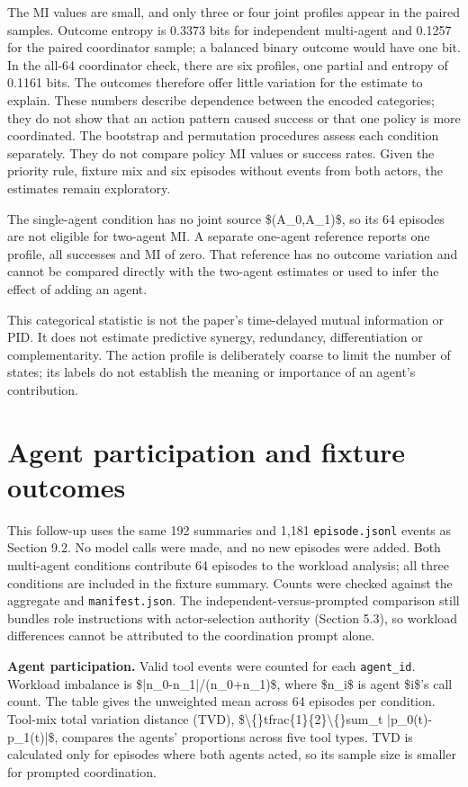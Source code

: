 \documentclass[12pt,a4paper,oneside]{report}
\begin{document}
The MI values are small, and only three or four joint profiles appear in the paired samples. Outcome entropy is 0.3373 bits for independent multi-agent and 0.1257 for the paired coordinator sample; a balanced binary outcome would have one bit. In the all-64 coordinator check, there are six profiles, one partial and entropy of 0.1161 bits. The outcomes therefore offer little variation for the estimate to explain. These numbers describe dependence between the encoded categories; they do not show that an action pattern caused success or that one policy is more coordinated. The bootstrap and permutation procedures assess each condition separately. They do not compare policy MI values or success rates. Given the priority rule, fixture mix and six episodes without events from both actors, the estimates remain exploratory.

The single-agent condition has no joint source \$(A\allowbreak\_0,A\allowbreak\_1)\$, so its 64 episodes are not eligible for two-agent MI. A separate one-agent reference reports one profile, all successes and MI of zero. That reference has no outcome variation and cannot be compared directly with the two-agent estimates or used to infer the effect of adding an agent.

This categorical statistic is not the paper’s time-delayed mutual information or PID. It does not estimate predictive synergy, redundancy, differentiation or complementarity. The action profile is deliberately coarse to limit the number of states; its labels do not establish the meaning or importance of an agent’s contribution.

\section{Agent participation and fixture outcomes}
This follow-up uses the same 192 summaries and 1,181 \texttt{episode.jsonl} events as Section 9.2. No model calls were made, and no new episodes were added. Both multi-agent conditions contribute 64 episodes to the workload analysis; all three conditions are included in the fixture summary. Counts were checked against the aggregate and \texttt{manifest.json}. The independent-versus-prompted comparison still bundles role instructions with actor-selection authority (Section 5.3), so workload differences cannot be attributed to the coordination prompt alone.

\textbf{Agent participation.} Valid tool events were counted for each \texttt{agent\allowbreak\_id}. Workload imbalance is \$|n\allowbreak\_0-n\allowbreak\_1|/(n\allowbreak\_0+n\allowbreak\_1)\$, where \$n\allowbreak\_i\$ is agent \$i\$’s call count. The table gives the unweighted mean across 64 episodes per condition. Tool-mix total variation distance (TVD), \$\textbackslash\{\}tfrac\{1\}\{2\}\textbackslash\{\}sum\allowbreak\_t |p\allowbreak\_0(t)-p\allowbreak\_1(t)|\$, compares the agents’ proportions across five tool types. TVD is calculated only for episodes where both agents acted, so its sample size is smaller for prompted coordination.
\end{document}
